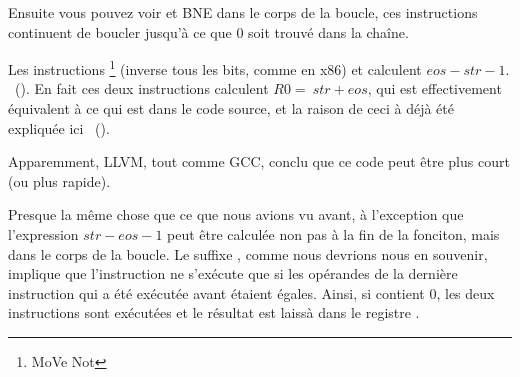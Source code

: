 Ensuite vous pouvez voir \CMP et \ac{BNE} dans le corps de la boucle, ces instructions
continuent de boucler jusqu'à ce que 0 soit trouvé dans la chaîne.

Les instructions \footnote{MoVe Not} (inverse tous les bits, comme \NOT
en x86) et \ADD calculent $eos - str - 1$.
~().
En fait ces deux instructions calculent $R0 = ~str + eos$, qui est effectivement
équivalent à ce qui est dans le code source, et la raison de ceci à déjà été expliquée
ici ~().

Apparemment, LLVM, tout comme GCC, conclu que ce code peut être plus court (ou plus
rapide).

\mysubparagraph{\OptimizingKeilVI (\ARMMode)}




Presque la même chose que ce que nous avions vu avant, à l'exception que l'expression
$str - eos - 1$ peut être calculée non pas à la fin de la fonciton, mais dans le
corps de la boucle.
Le suffixe , comme nous devrions nous en souvenir, implique que l'instruction
ne s'exécute que si les opérandes de la dernière instruction \CMP qui a été exécutée
avant étaient égales.
Ainsi, si  contient 0, les deux instructions  sont exécutées et
le résultat est laissà dans le registre .
